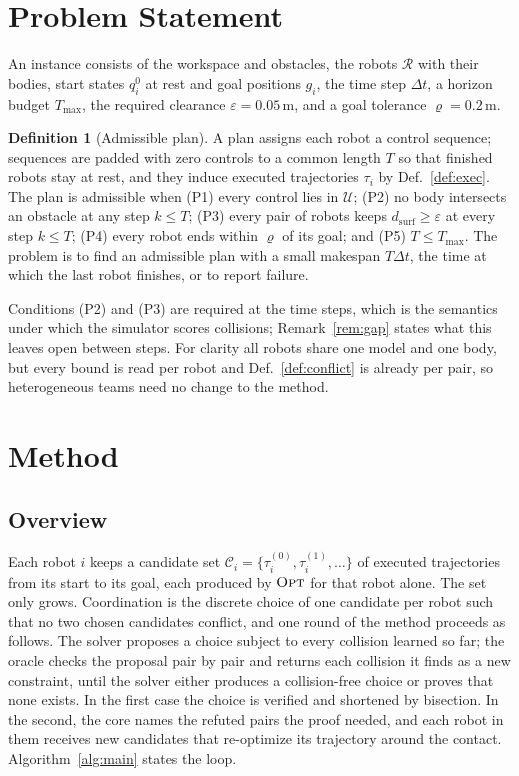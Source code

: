 \documentclass[conference]{IEEEtran}
\theoremstyle{plain}
\theoremstyle{definition}
\newtheorem{definition}{Definition}
\newcommand{\Rob}{\mathcal{R}}
\newcommand{\Cand}{\mathcal{C}}
\newcommand{\Uc}{\mathcal{U}}
\newcommand{\clr}{\varepsilon}
\begin{document}
\section{Problem Statement}
\label{sec:problem}

An instance consists of the workspace and obstacles, the robots $\Rob$ with their bodies,
start states $q_i^0$ at rest and goal positions $g_i$, the time step $\Delta t$, a horizon
budget $T_{\max}$, the required clearance $\clr = 0.05$\,m, and a goal tolerance
$\varrho = 0.2$\,m.

\begin{definition}[Admissible plan]
\label{def:plan}
A plan assigns each robot a control sequence; sequences are padded with zero controls to a
common length $T$ so that finished robots stay at rest, and they induce executed trajectories
$\tau_i$ by Def.~\ref{def:exec}. The plan is admissible when
(P1) every control lies in $\Uc$;
(P2) no body intersects an obstacle at any step $k \le T$;
(P3) every pair of robots keeps $d_{\text{surf}} \ge \clr$ at every step $k \le T$;
(P4) every robot ends within $\varrho$ of its goal; and
(P5) $T \le T_{\max}$.
The problem is to find an admissible plan with a small makespan $T\Delta t$, the time at which
the last robot finishes, or to report failure.
\end{definition}

Conditions (P2) and (P3) are required at the time steps, which is the semantics under which
the simulator scores collisions; Remark~\ref{rem:gap} states what this leaves open between
steps. For clarity all robots share one model and one body, but every bound is read per robot
and Def.~\ref{def:conflict} is already per pair, so heterogeneous teams need no change to the
method.

\section{Method}
\label{sec:method}

\subsection{Overview}

Each robot $i$ keeps a candidate set $\Cand_i = \{\tau_i^{(0)}, \tau_i^{(1)}, \dots\}$ of
executed trajectories from its start to its goal, each produced by $\textsc{Opt}$ for that
robot alone. The set only grows. Coordination is the discrete choice of one candidate per
robot such that no two chosen candidates conflict, and one round of the method proceeds as
follows. The solver proposes a choice subject to every collision learned so far; the oracle
checks the proposal pair by pair and returns each collision it finds as a new constraint,
until the solver either produces a collision-free choice or proves that none exists. In the
first case the choice is verified and shortened by bisection. In the second, the core names
the refuted pairs the proof needed, and each robot in them receives new candidates that
re-optimize its trajectory around the contact. Algorithm~\ref{alg:main} states the loop.
\end{document}
